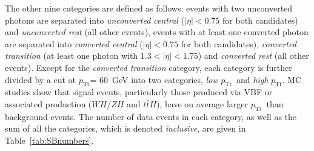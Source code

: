 \documentclass[final,3p,times,twocolumn]{elsarticle}
\newcommand{\ptt}{\ensuremath{p_{\mathrm{Tt}}}}
\begin{document}
The other nine categories are defined as follows:
events with two unconverted photons are separated into \emph{unconverted central} ($|\eta|<0.75$ for both candidates) and \emph{unconverted rest} (all other events),
events with at least one converted photon are separated into \emph{converted central} ($|\eta|<0.75$ for both candidates), \emph{converted transition} (at least one photon with $1.3<|\eta|<1.75$) and \emph{converted rest} (all other events).
Except for the \emph{converted transition} category, each category is further divided by a cut at \ptt = 60~GeV into two categories, \emph{low} \ptt\ and \emph{high} \ptt.
MC studies show that signal events, particularly those produced via VBF or associated production ($WH/ZH$ and $t\bar{t}H$),
have on average larger \ptt\ than background events.
The number of data events in each category, as well as 
the sum of all the categories, which is denoted \emph{inclusive}, are given in Table~\ref{tab:SBnumbers}.
\end{document}

